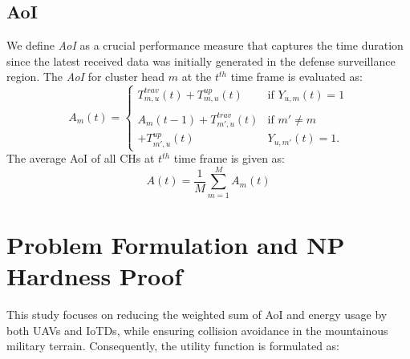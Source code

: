 \documentclass[conference]{IEEEtran}
\begin{document}
\subsection{AoI}
We define \textit{AoI} as a crucial performance measure that captures the time duration since the latest received data was initially generated in the defense surveillance region. The \textit{AoI} for cluster head $m$ at the $t^{th}$ time frame is evaluated as:
\begin{equation}\label{binary-v2} 
    A_m(t) = 
    \begin{cases}
       T_{m,u}^{trav}(t) + T_{m,u}^{up}(t) & \mbox{if }Y_{u,m}(t)=1 \\ 
       & \\
        A_m(t-1) +  T_{m',u}^{trav}(t)  & \mbox{if } m' \neq m\\
        + T_{m',u}^{up}(t)&Y_{u,m'}(t) = 1.
    \end{cases}
\end{equation}
The average AoI of all CHs at $t^{th}$ time frame is given as:
\begin{equation}
    A(t) = \frac{1}{M} \sum_{m=1}^M A_m(t)
\end{equation}
\section{Problem Formulation and NP Hardness Proof}
This study focuses on reducing the weighted sum of AoI and energy usage by both UAVs and IoTDs, while ensuring collision avoidance in the mountainous military terrain. Consequently, the utility function is formulated as:

\end{document}
